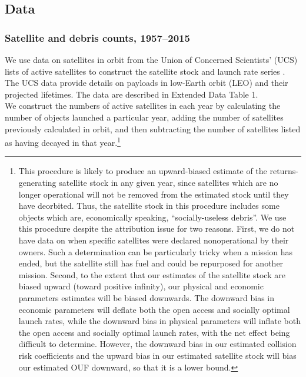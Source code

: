 \documentclass[9pt,twoside,lineno]{pnas-new}
\begin{document}
\subsection{Data}

\subsubsection{Satellite and debris counts, 1957--2015}

We use data on satellites in orbit from the Union of Concerned Scientists' (UCS) lists of active satellites to construct the satellite stock and launch rate series \citep{UCSdata}. The UCS data provide details on payloads in low-Earth orbit (LEO) and their projected lifetimes. The data are described in Extended Data Table 1. \\


We construct the numbers of active satellites in each year by calculating the number of objects launched a particular year, adding the number of satellites previously calculated in orbit, and then subtracting the number of satellites listed as having decayed in that year.\footnote{This procedure is likely to produce an upward-biased estimate of the returns-generating satellite stock in any given year, since satellites which are no longer operational will not be removed from the estimated stock until they have deorbited. Thus, the satellite stock in this procedure includes some objects which are, economically speaking, ``socially-useless debris''. We use this procedure despite the attribution issue for two reasons. First, we do not have data on when specific satellites were declared nonoperational by their owners. Such a determination can be particularly tricky when a mission has ended, but the satellite still has fuel and could be repurposed for another mission. Second, to the extent that our estimates of the satellite stock are biased upward (toward positive infinity), our physical and economic parameters estimates will be biased downwards. The downward bias in economic parameters will deflate both the open access and socially optimal launch rates, while the downward bias in physical parameters will inflate both the open access and socially optimal launch rates, with the net effect being difficult to determine. However, the downward bias in our estimated collision risk coefficients and the upward bias in our estimated satellite stock will bias our estimated OUF downward, so that it is a lower bound.} \\
\end{document}
